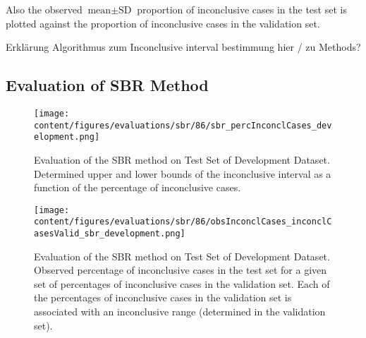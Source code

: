 Also the observed $\text{mean} \pm \text{SD}$ proportion of inconclusive cases in the test set is plotted 
against the proportion of inconclusive cases in the validation set.


Erklärung Algorithmus zum Inconclusive interval bestimmung hier / zu Methods? 



\subsection{Evaluation of SBR Method}
\label{subsec:eval_sbr}



\begin{figure}[t]
    \centering
    \texttt{[image: content/figures/evaluations/sbr/86/sbr\_percInconclCases\_development.png]}
    \caption{Evaluation of the SBR method on Test Set of Development Dataset. 
    Determined upper and lower bounds of the inconclusive interval as a function of the percentage of inconclusive cases.} 
    \label{fig:sbr_percInconclCases_development}
\end{figure}


\begin{figure}[h]
    \centering
    \texttt{[image: content/figures/evaluations/sbr/86/obsInconclCases\_inconclCasesValid\_sbr\_development.png]}
    \caption{Evaluation of the SBR method on Test Set of Development Dataset.
    Observed percentage of inconclusive cases in the test set 
    for a given set of percentages of inconclusive cases in the validation set.
    Each of the percentages of inconclusive cases in the validation set is associated 
    with an inconclusive range (determined in the validation set).} 
    \label{fig:obsInconclCases_inconclCasesValid_sbr_development}
\end{figure} 


